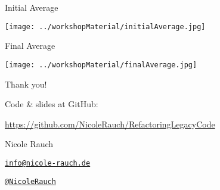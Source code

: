 \begin{frame}[fragile]{Initial Average}
\begin{center}
\texttt{[image: ../workshopMaterial/initialAverage.jpg]}
\end{center}
\end{frame}

\begin{frame}[fragile]{Final Average}
\begin{center}
\texttt{[image: ../workshopMaterial/finalAverage.jpg]}
\end{center}
\end{frame}


{
\begin{frame}{Thank you!}

        Code \& slides at GitHub:
        \begin{center}
                \url{https://github.com/NicoleRauch/RefactoringLegacyCode}
        \end{center}

        \begin{block}{Nicole Rauch}
        \begin{description}[Twitterxx]
                \item[E-Mail]  \href{mailto:info@nicole-rauch.de}{\texttt{info@nicole-rauch.de}}
                \item[Twitter] \href{http://twitter.com/NicoleRauch}{\texttt{@NicoleRauch}}
        \end{description}
        \end{block}
\end{frame}
}
